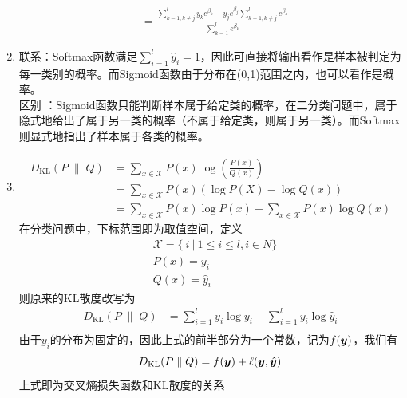 \documentclass[answers]{exam}  %
\begin{document}
\begin{questions}
\begin{solution}
\begin{enumerate}
\[\begin{aligned}
                &=\frac{\sum\limits^l_{k=1,k\not=j}y_ke^{\beta_k}-y_je^{\beta_j}\sum\limits^l_{k=1,k\not=j}e^{\beta_k}}{\sum^l_{k=1}e^{\beta_k}}
            \end{aligned}
        \]
        \item   联系：Softmax函数满足$\sum^l_{i=1}\hat y_i=1$，因此可直接将输出看作是样本被判定为每一类别的概率。而Sigmoid函数由于分布在(0,1)范围之内，也可以看作是概率。\\
                区别 ：Sigmoid函数只能判断样本属于给定类的概率，在二分类问题中，属于隐式地给出了属于另一类的概率（不属于给定类，则属于另一类）。而Softmax则显式地指出了样本属于各类的概率。
        \item 
        \[
            \begin{aligned}
                D_{\operatorname{KL}}(P\;\|\;Q) 
                &= \sum_{x \in \mathcal{X}} P(x)\log \left(\frac{P(x)}{Q(x)} \right)\\
                &=\sum_{x\in\mathcal X} P(x)\left(\log P(X)-\log{Q(x)}\right)\\
                &=\sum_{x\in\mathcal X} P(x)\log P(x)-\sum_{x\in\mathcal X} P(x)\log Q(x)
            \end{aligned}    
        \]
        在分类问题中，下标范围即为取值空间，定义
        \[
        \begin{aligned}
            &\mathcal X=\{\ i\ |\ 1\le i\le l,i\in N\}\\
            &P(x)=y_i\\
            &Q(x)=\hat y_i
        \end{aligned}    
        \]
        则原来的KL散度改写为
        \[
            \begin{aligned}
                D_{\operatorname{KL}}(P\;\|\;Q) 
                &=\sum^l_{i=1}y_i\log y_i-\sum^l_{i=1}y_i\log \hat y_i\\
            \end{aligned}  
        \]
        由于$y_i$的分布为固定的，因此上式的前半部分为一个常数，记为$f(\boldsymbol{y})$，我们有
        \[D_{\operatorname{KL}}(P\;\|\;Q) =f(\boldsymbol{y})+\ell(\boldsymbol{y},\hat{\boldsymbol{y}})\]
        上式即为交叉熵损失函数和KL散度的关系
    \end{enumerate}
\end{solution}


\end{questions}
\end{document}
